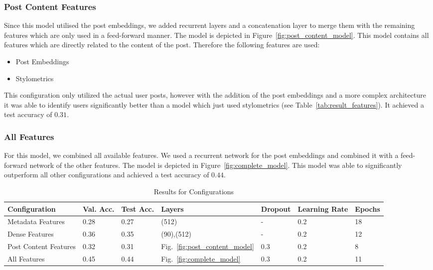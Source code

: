 \documentclass[acmsmall]{acmart}
\begin{document}
\subsubsection{Post Content Features}
Since this model utilised the post embeddings, we added recurrent layers and a concatenation layer to merge them with the remaining features which are only used in a feed-forward manner. 
The model is depicted in Figure~\ref{fig:post_content_model}.
This model contains all features which are directly related to the content of the post.
Therefore the following features are used:
\begin{itemize}
\item Post Embeddings
\item Stylometrics
\end{itemize}
This configuration only utilized the actual user posts, however with the addition of the post embeddings and a more complex architecture it was able to identify users significantly better than a model which just used stylometrics (see Table~\ref{tab:result_features}). It achieved a test accuracy of $0.31$.


\subsubsection{All Features}
For this model, we combined all available features. We used a recurrent network for the post embeddings and combined it with a feed-forward network of the other features. The model is depicted in Figure~\ref{fig:complete_model}. This model was able to significantly outperform all other configurations and achieved a test accuracy of $0.44$.


\begin{table}[H]
\begin{tabular}{lllllll}
Configuration & Val. Acc. & Test Acc. & Layers & Dropout & Learning Rate & Epochs\\ \hline
Metadata Features & 0.28 & 0.27 & (512) &  - & 0.2 & 18 \\
Dense Features & 0.36 & 0.35 & (90),(512) & - & 0.2 & 12 \\
Post Content Features & 0.32 & 0.31 & Fig.~\ref{fig:post_content_model} & 0.3 & 0.2 & 8 \\
All Features & 0.45 & 0.44 & Fig.~\ref{fig:complete_model} & 0.3 & 0.2 & 11 \\
\end{tabular}
\caption{Results for Configurations}
\label{tab:result_configurations}
\end{table}
\end{document}
